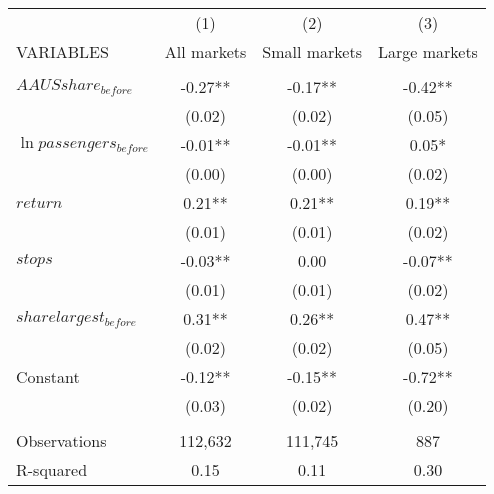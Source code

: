 \begin{tabular}{lccc} \hline
 & (1) & (2) & (3) \\
VARIABLES & All markets & Small markets & Large markets \\ \hline
 &  &  &  \\
$ AAUSshare_{before} $ & -0.27** & -0.17** & -0.42** \\
 & (0.02) & (0.02) & (0.05) \\
$ \ln passengers_{before} $ & -0.01** & -0.01** & 0.05* \\
 & (0.00) & (0.00) & (0.02) \\
$ return $ & 0.21** & 0.21** & 0.19** \\
 & (0.01) & (0.01) & (0.02) \\
$ stops $ & -0.03** & 0.00 & -0.07** \\
 & (0.01) & (0.01) & (0.02) \\
$ sharelargest_{before} $ & 0.31** & 0.26** & 0.47** \\
 & (0.02) & (0.02) & (0.05) \\
Constant & -0.12** & -0.15** & -0.72** \\
 & (0.03) & (0.02) & (0.20) \\
 &  &  &  \\
Observations & 112,632 & 111,745 & 887 \\
 R-squared & 0.15 & 0.11 & 0.30 \\ \hline
\end{tabular}
